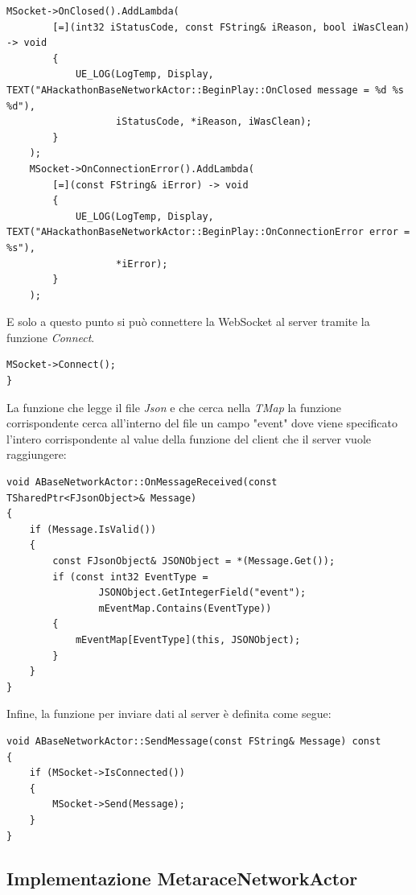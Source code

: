 \begin{lstlisting}[firstnumber=24, caption=Lambda function per la gestione della chiusura della connessione e dell'errore durante la connessione]
	MSocket->OnClosed().AddLambda(
		[=](int32 iStatusCode, const FString& iReason, bool iWasClean) -> void
		{
			UE_LOG(LogTemp, Display, TEXT("AHackathonBaseNetworkActor::BeginPlay::OnClosed message = %d %s %d"),
			       iStatusCode, *iReason, iWasClean);
		}
	);
	MSocket->OnConnectionError().AddLambda(
		[=](const FString& iError) -> void
		{
			UE_LOG(LogTemp, Display, TEXT("AHackathonBaseNetworkActor::BeginPlay::OnConnectionError error = %s"),
			       *iError);
		}
	);
\end{lstlisting}

E solo a questo punto si può connettere la WebSocket al server tramite la funzione \textit{Connect}. 
\begin{lstlisting}[firstnumber=38, caption = Connessione della WebSocket]
	MSocket->Connect();
}
\end{lstlisting}

La funzione che legge il file \textit{Json} e che cerca nella \textit{TMap} la funzione corrispondente cerca all'interno del file un campo "event" dove viene specificato l'intero corrispondente al value della funzione del client che il server vuole raggiungere:

\begin{lstlisting}[caption = funzione che gestisce la ricezione del messaggio in ABaseNetworkActor, label = {alg:OnMessageReceived}]
void ABaseNetworkActor::OnMessageReceived(const TSharedPtr<FJsonObject>& Message)
{
    if (Message.IsValid())
    {
        const FJsonObject& JSONObject = *(Message.Get());
        if (const int32 EventType = 
                JSONObject.GetIntegerField("event"); 
                mEventMap.Contains(EventType))
        {
            mEventMap[EventType](this, JSONObject);
        }
    }
}    
\end{lstlisting}

Infine, la funzione per inviare dati al server è definita come segue:

\begin{lstlisting}[caption = Funzione per inviare dati al server attraverso la WebSocket, label = {alg:SendMessage}]
void ABaseNetworkActor::SendMessage(const FString& Message) const
{
    if (MSocket->IsConnected())
    {
        MSocket->Send(Message);
    }
}
\end{lstlisting}

    \subsection{Implementazione MetaraceNetworkActor}

